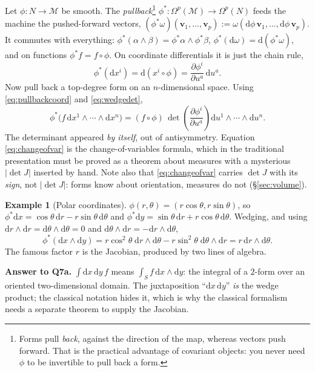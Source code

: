 \documentclass[10pt,a4paper]{article}
\newcommand{\dd}{\mathrm{d}}
\newcommand{\M}{\mathcal{M}}
\newcommand{\Om}{\Omega}
\newcommand{\pd}[2]{\frac{\partial #1}{\partial #2}}
\newcommand{\vv}{\mathbf{v}}
\theoremstyle{plain}
\theoremstyle{definition}
\newtheorem{ex}[thm]{Example}
\numberwithin{equation}{section}
\begin{document}
Let $\phi:N\to\M$ be smooth. The \emph{pullback}\footnote{Forms pull \emph{back}, against the
direction of the map, whereas vectors push forward. That is the practical advantage of
covariant objects: you never need $\phi$ to be invertible to pull back a form.}
$\phi^*:\Om^p(\M)\to\Om^p(N)$ feeds the machine the pushed-forward vectors,
$(\phi^*\omega)(\vv_1,\dots,\vv_p):=\omega(\dd\phi\,\vv_1,\dots,\dd\phi\,\vv_p)$. It commutes
with everything: $\phi^*(\alpha\wedge\beta)=\phi^*\alpha\wedge\phi^*\beta$,
$\phi^*(\dd\omega)=\dd(\phi^*\omega)$, and on functions $\phi^*f=f\circ\phi$. On coordinate
differentials it is just the chain rule,
\begin{equation}
\phi^*(\dd x^i)=\dd(x^i\circ\phi)=\pd{\phi^i}{u^a}\,\dd u^a .
\label{eq:pullbackcoord}
\end{equation}
Now pull back a top-degree form on an $n$-dimensional space. Using \eqref{eq:pullbackcoord} and
\eqref{eq:wedgedet},
\begin{equation}
\boxed{\ \phi^*\!\big(f\,\dd x^1\wedge\cdots\wedge\dd x^n\big)
=(f\circ\phi)\,\det\!\left(\pd{\phi^i}{u^a}\right)\dd u^1\wedge\cdots\wedge\dd u^n .\ }
\label{eq:changeofvar}
\end{equation}
The determinant appeared \emph{by itself}, out of antisymmetry. Equation \eqref{eq:changeofvar}
is the change-of-variables formula, which in the traditional presentation must be proved as a
theorem about measures with a mysterious $|\det J|$ inserted by hand. Note also that
\eqref{eq:changeofvar} carries $\det J$ with its \emph{sign}, not $|\det J|$: forms know about
orientation, measures do not (\S\ref{sec:volume}).

\begin{ex}[Polar coordinates]\label{ex:polar}
$\phi(r,\theta)=(r\cos\theta,r\sin\theta)$, so $\phi^*\dd x=\cos\theta\,\dd r-r\sin\theta\,\dd\theta$
and $\phi^*\dd y=\sin\theta\,\dd r+r\cos\theta\,\dd\theta$. Wedging, and using
$\dd r\wedge\dd r=\dd\theta\wedge\dd\theta=0$ and $\dd\theta\wedge\dd r=-\dd r\wedge\dd\theta$,
\begin{equation}
\phi^*(\dd x\wedge\dd y)=r\cos^2\theta\;\dd r\wedge\dd\theta-r\sin^2\theta\;\dd\theta\wedge\dd r
=r\,\dd r\wedge\dd\theta .
\end{equation}
The famous factor $r$ is the Jacobian, produced by two lines of algebra.
\end{ex}

\begin{keybox}
\textbf{Answer to Q7a.} $\int\dd x\,\dd y\,f$ means $\int_S f\,\dd x\wedge\dd y$: the integral
of a $2$-form over an oriented two-dimensional domain. The juxtaposition ``$\dd x\,\dd y$''
\emph{is} the wedge product; the classical notation hides it, which is why the classical
formalism needs a separate theorem to supply the Jacobian.
\end{keybox}
\end{document}
